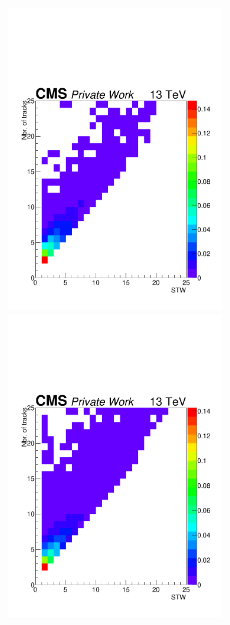 \documentclass{cernatlasnote}
\begin{document}
\begin{appendices}
\begin{figure}[ht]
\includegraphics[height=8cm, width=9cm, trim= 0cm 0cm 0cm 0cm,clip]{images/VTXBDT/STW_Ntrks_200_180_100.pdf}\includegraphics[height=8cm, width=9cm, trim= 0cm 0cm 0cm 0cm,clip]{images/VTXBDT/STW_Ntrks_300_180_100.pdf}

\end{figure}
\end{appendices}
\end{document}
